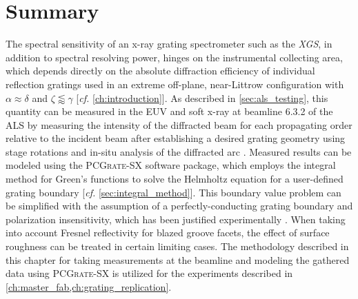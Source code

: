 \section{Summary}\label{sec:ch2_summary} 
The spectral sensitivity of an x-ray grating spectrometer such as the \emph{XGS}, in addition to spectral resolving power, hinges on the instrumental collecting area, which depends directly on the absolute diffraction efficiency of individual reflection gratings used in an extreme off-plane, near-Littrow configuration with $\alpha \approx \delta$ and $\zeta \lessapprox \gamma$ [\emph{cf.\@} \cref{ch:introduction}]. 
As described in \cref{sec:als_testing}, this quantity can be measured in the EUV and soft x-ray at beamline 6.3.2 of the ALS \cite{ALS_632,Underwood96,Gullikson01} by measuring the intensity of the diffracted beam for each propagating order relative to the incident beam after establishing a desired grating geometry using stage rotations and in-situ analysis of the diffracted arc \cite{Miles18}. 
Measured results can be modeled using the \textsc{PCGrate-SX} software package, which employs the integral method for Green's functions to solve the Helmholtz equation for a user-defined grating boundary [\emph{cf.\@} \cref{sec:integral_method}].  
This boundary value problem can be simplified with the assumption of a perfectly-conducting grating boundary and polarization insensitivity, which has been justified experimentally \cite{Marlowe16}. 
When taking into account Fresnel reflectivity for blazed groove facets, the effect of surface roughness can be treated in certain limiting cases. 
The methodology described in this chapter for taking measurements at the beamline and modeling the gathered data using \textsc{PCGrate-SX} is utilized for the experiments described in \cref{ch:master_fab,ch:grating_replication}.